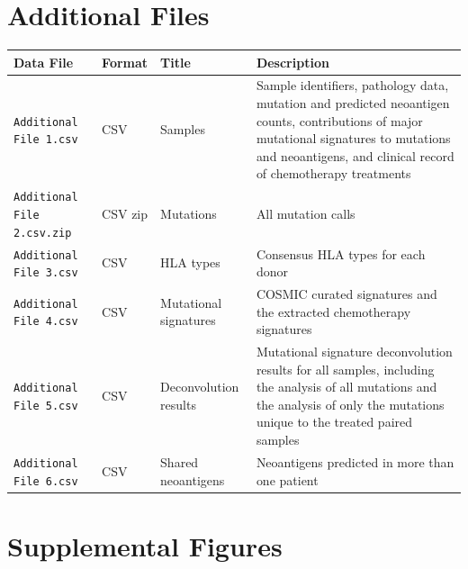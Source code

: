 
\section*{Additional Files}

\setcounter{equation}{0}
\setcounter{figure}{0}
\setcounter{table}{0}
\makeatletter
\renewcommand{\theequation}{S\arabic{equation}}
\renewcommand{\thefigure}{S\arabic{figure}}

\begin{center}
    \begin{tabular}{ | l | l | l | p{8cm} |}
    \hline
    Data File & Format & Title & Description \\ \hline
    \texttt{Additional File 1.csv} & CSV & Samples & Sample identifiers, pathology data, mutation and predicted neoantigen counts, contributions of major mutational signatures to mutations and neoantigens, and clinical record of chemotherapy treatments \\ \hline

    \texttt{Additional File 2.csv.zip} & CSV zip & Mutations & All mutation calls \\ \hline
    
    \texttt{Additional File 3.csv} & CSV & HLA types & Consensus HLA types for each donor \\ \hline
    
    \texttt{Additional File 4.csv} & CSV & Mutational signatures & COSMIC curated signatures and the extracted chemotherapy signatures \\ \hline

    \texttt{Additional File 5.csv} & CSV & Deconvolution results & Mutational signature deconvolution results for all samples, including the analysis of all mutations and the analysis of only the mutations unique to the treated paired samples  \\ \hline
    
    \texttt{Additional File 6.csv} & CSV & Shared neoantigens & Neoantigens predicted in more than one patient  \\ \hline
    \end{tabular}
\end{center}


\section*{Supplemental Figures}


